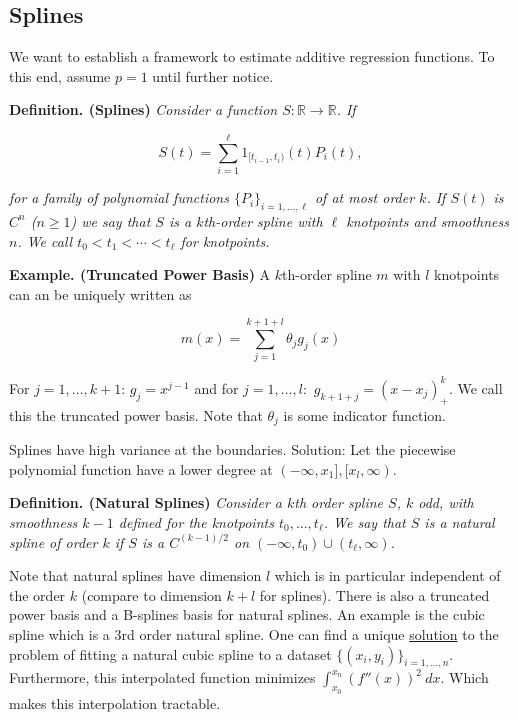 \documentclass[a4paper,12pt,openany]{book}
\begin{document}
\hypertarget{splines}{%
\subsection{Splines}\label{splines}}

We want to establish a framework to estimate additive regression functions. To this end, assume \(p=1\) until further notice.

\textbf{Definition. (Splines)} \emph{Consider a function \(S : \mathbb R\to \mathbb R\). If}

\[
S(t)=\sum_{i=1}^\ell 1_{[t_{i-1},t_i)}(t)P_i(t),
\]

\emph{for a family of polynomial functions \(\{P_i\}_{i=1,...,\ell}\) of at most order \(k\). If \(S(t)\) is \(C^n\) (\(n\ge 1\)) we say that \(S\) is a \(k\)th-order spline with \(\ell\) knotpoints and smoothness \(n\). We call \(t_0<t_1<\cdots <t_\ell\) for knotpoints.}

\textbf{Example. (Truncated Power Basis)} A \(k\)th-order spline \(m\) with \(l\) knotpoints can an be uniquely written as

\[
m(x)=\sum_{j=1}^{k+1+l}\theta_jg_j(x)
\]

For \(j=1,\dots, k+1\): \(g_{j}=x^{j-1}\) and for \(j=1,\dots,l:\) \(g_{k+1+j}=(x-x_j)^k_+\). We call this the truncated power basis. Note that \(\theta_j\) is some indicator function.

Splines have high variance at the boundaries. Solution: Let the piecewise polynomial function have a lower degree at \((-\infty,x_1],[x_l,\infty)\).

\textbf{Definition. (Natural Splines)} \emph{Consider a \(k\)th order spline \(S\), \(k\) odd, with smoothness \(k-1\) defined for the knotpoints \(t_0,...,t_\ell\). We say that \(S\) is a natural spline of order \(k\) if \(S\) is a \(C^{(k-1)/2}\) on \((-\infty,t_0)\cup (t_\ell,\infty)\).}

Note that natural splines have dimension \(l\) which is in particular independent of the order \(k\) (compare to dimension \(k+l\) for splines). There is also a truncated power basis and a B-splines basis for natural splines. An example is the cubic spline which is a 3rd order natural spline. One can find a unique \href{https://random-walks.org/content/misc/ncs/ncs.html}{solution} to the problem of fitting a natural cubic spline to a dataset \(\{(x_i,y_i)\}_{i=1,...,n}\). Furthermore, this interpolated function minimizes \(\int_{x_0}^{x_n} (f''(x))^2\ dx\). Which makes this interpolation tractable.
\end{document}
